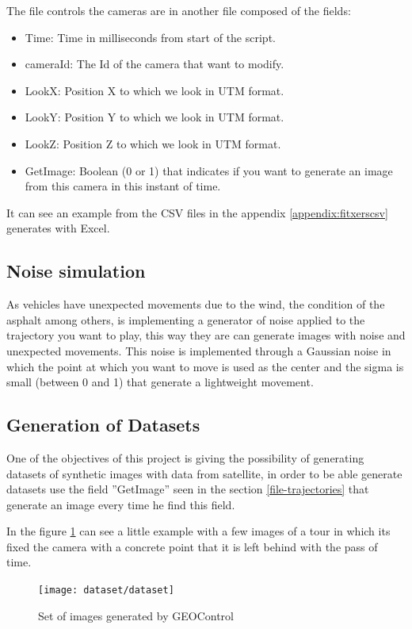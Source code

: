 \documentclass[10pt,a4paper,twocolumn,twoside]{article}
\begin{document}
The file controls the cameras are in another file composed of the fields:

\begin{itemize}
\item Time: Time in milliseconds from start of the script.
\item cameraId: The Id of the camera that want to modify.
\item LookX: Position X to which we look in UTM format.
\item LookY: Position Y to which we look in UTM format.
\item LookZ: Position Z to which we look in UTM format.
\item GetImage: Boolean (0 or 1) that indicates if you want to generate an image from this camera in this instant of time.
\end{itemize}

It can see an example from the CSV files in the appendix \ref{appendix:fitxerscsv} generates with Excel.

\subsection{Noise simulation}

As vehicles have unexpected movements due to the wind, the condition of the asphalt among others, is implementing a generator of noise applied to the trajectory you want to play, this way they are can generate images with noise and unexpected movements. This noise is implemented through a Gaussian noise in which the point at which you want to move is used as the center and the sigma is small (between 0 and 1) that generate a lightweight movement.

\subsection{Generation of Datasets}
One of the objectives of this project is giving the possibility of generating datasets of synthetic images with data from satellite, in order to be able generate datasets use the field ''GetImage'' seen in the section \ref{file-trajectories} that generate an image every time he find this field.

In the figure \ref{fig-dataset}  can see a little example with a few images of a tour in which its fixed the camera with a concrete point that it is left behind with the pass of time.

\begin{figure}[!h]
\centering
  	\texttt{[image: dataset/dataset]}
	\caption{Set of images generated by GEOControl}
	\label{fig-dataset}
\end{figure}
\end{document}
